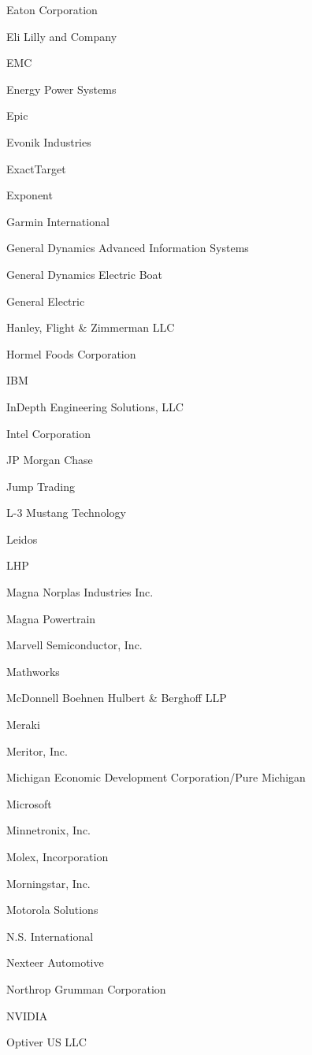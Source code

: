 \documentclass[twoside]{article}
\begin{document}
\begin{center}
\begin{multicols}{5}
\begin{FlushLeft}
\begin{compactitem}
\item Eaton Corporation
\item Eli Lilly and Company
\item EMC
\item Energy Power Systems
\item Epic
\item Evonik Industries
\item ExactTarget
\item Exponent
\item Garmin International
\item General Dynamics Advanced Information Systems
\item General Dynamics Electric Boat
\item General Electric
\item Hanley, Flight \& Zimmerman LLC
\item Hormel Foods Corporation
\item IBM
\item InDepth Engineering Solutions, LLC
\item Intel Corporation
\item JP Morgan Chase
\item Jump Trading
\item L-3 Mustang Technology
\item Leidos
\item LHP
\item Magna Norplas Industries Inc.
\item Magna Powertrain
\item Marvell Semiconductor, Inc.
\item Mathworks
\item McDonnell Boehnen Hulbert \& Berghoff LLP
\item Meraki
\item Meritor, Inc.
\item Michigan Economic Development Corporation/Pure Michigan
\item Microsoft
\item Minnetronix, Inc.
\item Molex, Incorporation
\item Morningstar, Inc.
\item Motorola Solutions
\item N.S. International
\item Nexteer Automotive
\item Northrop Grumman Corporation
\item NVIDIA
\item Optiver US LLC

\end{compactitem}
\end{FlushLeft}
\end{multicols}
\end{center}
\end{document}
